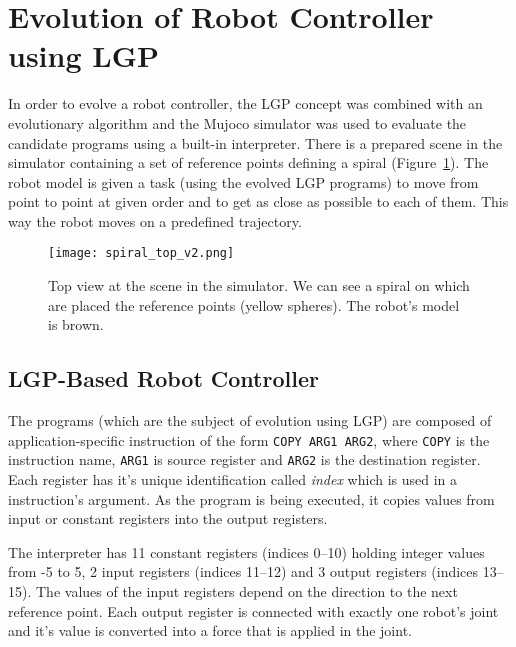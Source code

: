 \documentclass{ExcelAtFIT}
\begin{document}

\section{Evolution of Robot Controller using LGP}
\label{sec:ExperimentsSetup}
In order to evolve a robot controller, the LGP concept was combined with an evolutionary algorithm and the Mujoco simulator\cite{Todorov2012} was used to evaluate the candidate programs using a built-in interpreter.
There is a prepared scene in the simulator containing a set of reference points defining a spiral (Figure~\ref{fig:SpiralTop}).
The robot model is given a task (using the evolved LGP programs) to move from point to point at given order and to get as close as possible to each of them.
This way the robot moves on a predefined trajectory.

\begin{figure}[t]
\centering
{\texttt{[image: spiral\_top\_v2.png]}}
\caption{Top view at the scene in the simulator.
We can see a spiral on which are placed the reference points (yellow spheres).
The robot's model is brown.
}
\label{fig:SpiralTop}
\end{figure}


\subsection{LGP-Based Robot Controller}
\label{subsec:lgp-basedRobotController}
The programs (which are the subject of evolution using LGP) are composed of application-specific instruction of the form \texttt{COPY ARG1 ARG2}, where \texttt{COPY} is the instruction name, \texttt{ARG1} is source register and \texttt{ARG2} is the destination register.
Each register has it's unique identification called \textit{index} which is used in a instruction's argument.
As the program is being executed, it copies values from input or constant registers into the output registers.

The interpreter has 11 constant registers (indices 0–10) holding integer values from -5 to 5, 2 input registers (indices 11–12) and 3 output registers (indices 13–15).
The values of the input registers depend on the direction to the next reference point.
Each output register is connected with exactly one robot's joint and it's value is converted into a force that is applied in the joint.
\end{document}
